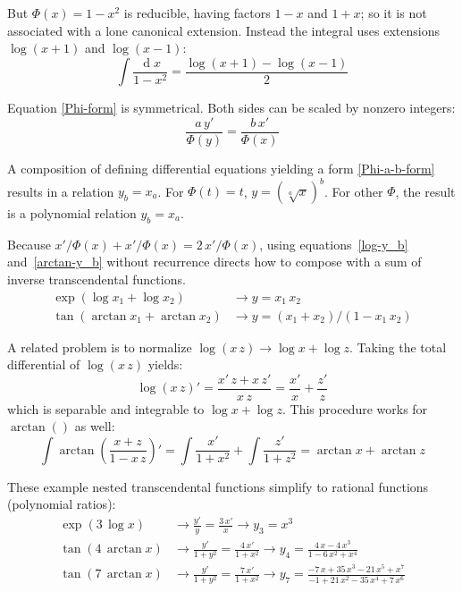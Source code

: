 \documentclass[10pt,letterpaper]{article}
\theoremstyle{proclaim}
\DeclareMathOperator{\diff}{d}
\begin{document}
But $\Phi(x)=1-x^2$ is reducible, having factors $1-x$ and $1+x$; so
it is not associated with a lone canonical extension.  Instead
the integral uses extensions $\log(x+1)$ and $\log(x-1)$:
\[
\int{\frac{\diff{x}}{1-x^2}}={\frac{\log(x+1)-\log(x-1)}{2}}
\]

Equation \eqref{Phi-form} is symmetrical.  Both sides can be scaled by
nonzero integers:
\begin{equation}
{\frac{a\,y'}{\Phi(y)}}={\frac{b\,x'}{\Phi(x)}}\label{Phi-a-b-form}
\end{equation}

A composition of defining differential equations yielding a
form \eqref{Phi-a-b-form} results in a relation $y_{b}=x_{a}$.  For
$\Phi(t)=t$, $y=(\sqrt[a]{x})^b$.  For other $\Phi$, the result is
a polynomial relation $y_{b}=x_{a}$.

Because ${x'/\Phi(x)}+{x'/\Phi(x)}=2\,{x'/\Phi(x)}$, using
equations~\eqref{log-y_b} and~\eqref{arctan-y_b} without recurrence
directs how to compose with a sum of inverse transcendental functions.
\begin{equation}
\begin{aligned}
  \exp(\log x_1+\log x_2)&\to y=x_1\,x_2\\
  \tan(\arctan x_1+\arctan x_2)&\to y=(x_1+x_2)/(1-x_1\,x_2)
\end{aligned}
\label{composition-of-sum}
\end{equation}

A related problem is to normalize $\log(x\,z)\to\log x+\log z$.
Taking the total differential of $\log(x\,z)$ yields:
  \[
\log(x\,z)'={\frac{x'\,z+x\,z'}{ x\,z}}={\frac{x'}{ x}}+{\frac{z'}{ z}}
\]
which is separable and integrable to $\log x+\log z$.  This procedure
works for $\arctan()$ as well:
  \[
\int\arctan\left({\frac{x+z}{1-x\,z}}\right)'=\int{\frac{x'}{1+x^2}}+\int{\frac{z'}{1+z^2}}
  =\arctan x+\arctan z
\]

These example nested transcendental functions simplify to rational
functions (polynomial ratios):
\[
\begin{aligned}
\exp(3\,\log x)&\to{\frac{y'}{ y}}={\frac{3\,x'}{ x}}\to y_3=x^3\\
\tan(4\,\arctan x)&\to
  {\frac{y'}{1+y^2}}={\frac{4\,x'}{1+x^2}}\to
  y_4={\frac{{4\,x-4\,x^{3}}}{{1-6\,x^{2}+x^{4}}}}\\
\tan(7\,\arctan x)&\to
  {\frac{y'}{1+y^2}}={\frac{7\,x'}{1+x^2}}\to
  y_7={\frac{{-7\,x+35\,x^{3}-21\,x^{5}+x^{7}}}{{-1+21\,x^{2}-35\,x^{4}+7\,x^{6}}}}
\end{aligned}
\]
\end{document}
